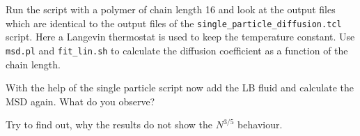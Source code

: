 Run the script with a polymer of chain length 16 and look at the output files
which are identical to the output files of the \lstinline|single_particle_diffusion.tcl|
script. Here a Langevin thermostat is used to keep the temperature constant.
Use \lstinline|msd.pl| and \lstinline|fit_lin.sh| to calculate the diffusion
coefficient as a function of the chain length.


With the help of the single particle script now add the LB fluid and calculate
the MSD again. What do you observe?

Try to find out, why the results do not show the $N^{3/5}$ behaviour.
